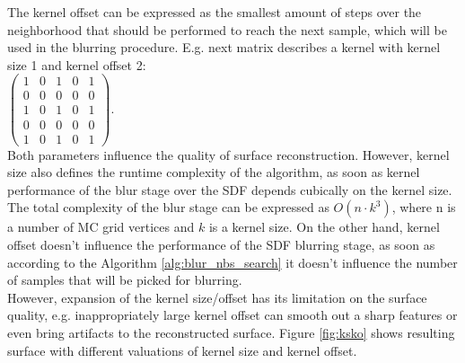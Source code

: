 The kernel offset can be expressed as the smallest amount of steps over the neighborhood that should be performed to reach the next sample, which will be used in the blurring procedure. E.g. next matrix describes a kernel with kernel size 1 and kernel offset 2: \\
$
\begin{pmatrix}
	1 & 0 & 1 & 0 & 1\\
	0 & 0 & 0 & 0 & 0\\
	1 & 0 & 1 & 0 & 1\\
	0 & 0 & 0 & 0 & 0\\
	1 & 0 & 1 & 0 & 1
\end{pmatrix}
$.\\
Both parameters influence the quality of surface reconstruction. However, kernel size also defines the runtime complexity of the algorithm, as soon as kernel performance of the blur stage over the SDF depends cubically on the kernel size. The total complexity of the blur stage can be expressed as $O(n\cdot k^3)$, where n is a number of MC grid vertices and $k$ is a kernel size. On the other hand, kernel offset doesn't influence the performance of the SDF blurring stage, as soon as according to the Algorithm \ref{alg:blur_nbs_search} it doesn't influence the number of samples that will be picked for blurring.\\
However, expansion of the kernel size/offset has its limitation on the surface quality, e.g. inappropriately large kernel offset can smooth out a sharp features or even bring artifacts to the reconstructed surface. Figure \ref{fig:ksko} shows resulting surface with different valuations of kernel size and kernel offset.\\
